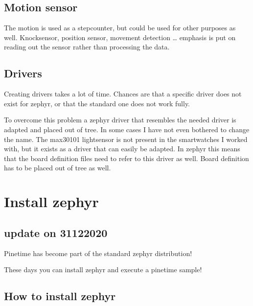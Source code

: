 \documentclass[letterpaper,10pt,english]{sphinxmanual}
\begin{document}
\section{Motion sensor}
\label{\detokenize{idea:motion-sensor}}
The motion is used as a stepcounter, but could be used for other purposes as well. Knocksensor, position sensor, movement detection …
emphasis is put on reading out the sensor rather than processing the data.


\section{Drivers}
\label{\detokenize{idea:drivers}}
Creating drivers takes a lot of time. Chances are that a specific driver does not exist for zephyr, or that the standard one does not work fully.

To overcome this problem a zephyr driver that resembles the needed driver is adapted and placed out of tree. In some cases I have not even bothered to change the name. The max30101 lightsensor is not present in the smartwatches I worked with, but it exists as a driver that can easily be adapted. In zephyr this means that the board definition files need to refer to this driver as well. Board definition has to be placed out of tree as well.


\chapter{Install zephyr}
\label{\detokenize{installation:install-zephyr}}\label{\detokenize{installation::doc}}

\section{update on 31\sphinxhyphen{}12\sphinxhyphen{}2020}
\label{\detokenize{installation:update-on-31-12-2020}}
Pinetime has become part of the standard zephyr distribution!

These days you can install zephyr and execute a pinetime sample!

\begin{sphinxVerbatim}[commandchars=\\\{\}]
     
\end{sphinxVerbatim}


\section{How to install zephyr}
\label{\detokenize{installation:how-to-install-zephyr}}
\end{document}
